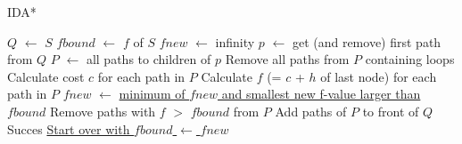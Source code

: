 \documentclass[11pt] {article}
\newcommand{\algorithmicalgo}{\textbf{Algorithm:}}
\newcommand{\ALGO}{\item[\algorithmicalgo]}
\begin{document}
\noindent \large{IDA*}\\
\begin{algorithmic}
\ALGO
\STATE $Q$ $\leftarrow$ $S$
\STATE $fbound$ $\leftarrow$ $f$ of $S$
\STATE $fnew$ $\leftarrow$ infinity
\STATE $p$ $\leftarrow$ get (and remove) first path from $Q$
\STATE $P$ $\leftarrow$ all paths to children of $p$
\STATE Remove all paths from $P$ containing loops
\STATE Calculate cost $c$ for each path in $P$
\STATE Calculate $f$ (= $c$ + $h$ of last node) for each path in $P$
\STATE $fnew$ $\leftarrow$ \underline{minimum of $fnew$ and smallest new f-value larger than $fbound$}
\STATE Remove paths with $f$ $>$ $fbound$ from $P$
\STATE Add paths of $P$ to front of $Q$
\ENDWHILE
{}
\STATE Succes
\ELSE
\STATE \underline{Start over with $fbound$ $\leftarrow$ $fnew$}
\ENDIF
\end{algorithmic}
\end{document}
